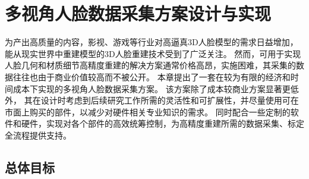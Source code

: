 \chapter{多视角人脸数据采集方案设计与实现}
\label{chap:platform}

为产出高质量的内容，影视、游戏等行业对高逼真3D人脸模型的需求日益增加，
能从现实世界中重建模型的3D人脸重建技术受到了广泛关注。
然而，可用于实现人脸几何和材质细节高精度重建的解决方案通常价格高昂，实施困难，其采集的数据往往也由于商业价值较高而不被公开。
本章提出了一套在较为有限的经济和时间成本下实现的多视角人脸数据采集方案。
该方案除了成本较商业方案显著更低外，
其在设计时考虑到后续研究工作所需的灵活性和可扩展性，并尽量使用可在市面上购买的部件，以减少对硬件相关专业知识的需求。
同时配合一些定制的软件和硬件，实现对各个部件的高效统筹控制，为高精度重建所需的数据采集、标定全流程提供支持。

\section{总体目标}

